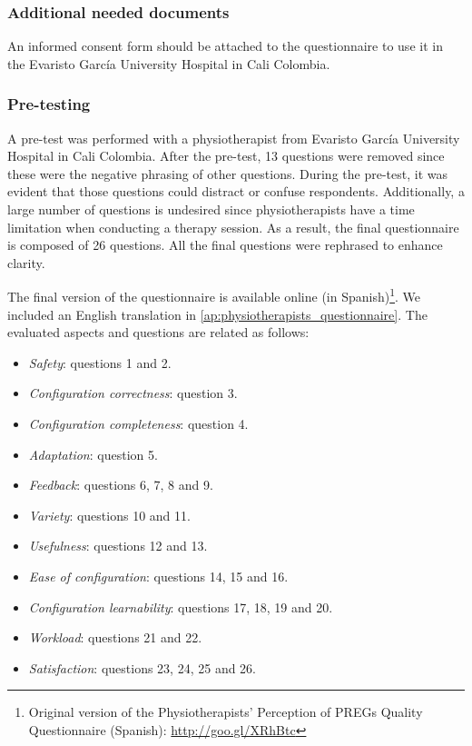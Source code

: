 \subsubsection*{Additional needed documents}
An informed consent form should be attached to the questionnaire to use it in the Evaristo Garc\'ia University Hospital in Cali Colombia.

\subsubsection{Pre-testing}
A pre-test was performed with a physiotherapist from Evaristo Garc\'ia University Hospital in Cali Colombia. After the pre-test, 13 questions were removed since these were the negative phrasing of other questions. During the pre-test, it was evident that those questions could distract or confuse respondents. Additionally, a large number of questions is undesired since physiotherapists have a time limitation when conducting a therapy session. As a result, the final questionnaire is composed of 26 questions. All the final questions were rephrased to enhance clarity.

The final version of the questionnaire is available online (in Spanish)\footnote{Original version of the Physiotherapists' Perception of \acp{PREG} Quality Questionnaire (Spanish): \url{http://goo.gl/XRhBtc}}. We included an English translation in \autoref{ap:physiotherapists_questionnaire}. The evaluated aspects and questions are related as follows:

\begin{itemize}
    \item \emph{Safety}: questions 1 and 2.
    \item \emph{Configuration correctness}: question 3.
    \item \emph{Configuration completeness}: question 4.
    \item \emph{Adaptation}: question 5.
    \item \emph{Feedback}: questions 6, 7, 8 and 9.
    \item \emph{Variety}: questions 10 and 11.
    \item \emph{Usefulness}: questions 12 and 13.
    \item \emph{Ease of configuration}: questions 14, 15 and 16.
    \item \emph{Configuration learnability}: questions 17, 18, 19 and 20.
    \item \emph{Workload}: questions 21 and 22.
    \item \emph{Satisfaction}: questions 23, 24, 25 and 26.
\end{itemize}

